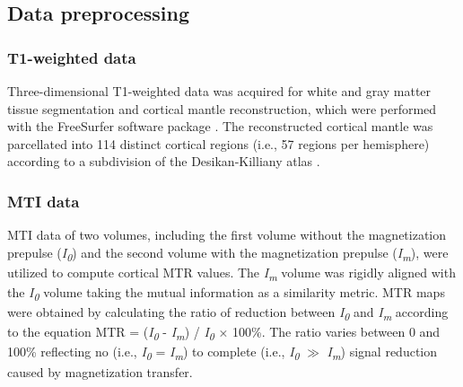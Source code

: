 \begin{refsection}
\subsection*{Data preprocessing}
\subsubsection*{T1-weighted data}
Three-dimensional T1-weighted data was acquired for white and gray matter tissue segmentation and cortical mantle reconstruction, which were performed with the FreeSurfer software package \citep{FISCHL2012Freesurfer}. The reconstructed cortical mantle was parcellated into 114 distinct cortical regions (i.e., 57 regions per hemisphere) according to a subdivision of the Desikan-Killiany atlas \citep{Fischl2004parcellation,CAMMOUN2012386,DESIKAN2006968}.

\subsubsection*{MTI data}
MTI data of two volumes, including the first volume without the magnetization prepulse (\textit{I\textsubscript{0}}) and the second volume with the magnetization prepulse (\textit{I\textsubscript{m}}), were utilized to compute cortical MTR values. The \textit{I\textsubscript{m}} volume was rigidly aligned with the \textit{I\textsubscript{0}} volume taking the mutual information as a similarity metric. MTR maps were obtained by calculating the ratio of reduction between \textit{I\textsubscript{0}} and \textit{I\textsubscript{m}} according to the equation MTR = (\textit{I\textsubscript{0}} - \textit{I\textsubscript{m}}) / \textit{I\textsubscript{0}} × 100\%. The ratio varies between 0 and 100\% reflecting no (i.e., \textit{I\textsubscript{0}} = \textit{I\textsubscript{m}}) to complete (i.e., \textit{I\textsubscript{0}} $\mathsf{\gg}$ \textit{I\textsubscript{m}}) signal reduction caused by magnetization transfer.


\end{refsection}

